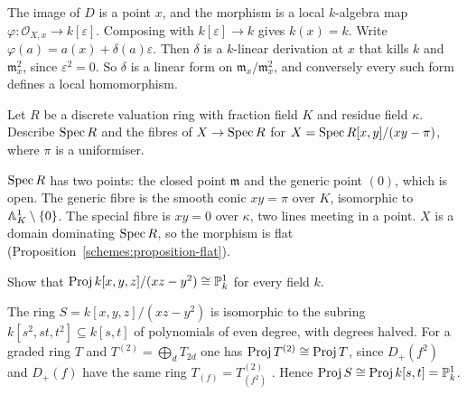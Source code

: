\begin{solution}
The image of $D$ is a point $x$, and the morphism is a local $k$-algebra map $\varphi \colon \mathcal{O}_{X,x} \to k[\varepsilon]$. Composing with
$k[\varepsilon] \to k$ gives $k(x) = k$. Write $\varphi(a) = a(x) + \delta(a)\varepsilon$. Then $\delta$ is a $k$-linear derivation at $x$ that kills $k$ and $\mathfrak{m}_x^2$,
since $\varepsilon^2 = 0$. So $\delta$ is a linear form on $\mathfrak{m}_x/\mathfrak{m}_x^2$, and conversely every such form defines a local homomorphism.
\end{solution}

\begin{exercise}\label{schemes:exercise-dvr}
Let $R$ be a discrete valuation ring with fraction field $K$ and residue field $\kappa$. Describe $\operatorname{Spec} R$ and the fibres of $X \to \operatorname{Spec} R$ for
$X = \operatorname{Spec} R[x, y]/(xy - \pi)$, where $\pi$ is a uniformiser.
\end{exercise}

\begin{solution}
$\operatorname{Spec} R$ has two points: the closed point $\mathfrak{m}$ and the generic point $(0)$, which is open. The generic fibre is the smooth conic $xy = \pi$ over
$K$, isomorphic to $\mathbb{A}^1_K \setminus \{0\}$. The special fibre is $xy = 0$ over $\kappa$, two lines meeting in a point. $X$ is a domain dominating $\operatorname{Spec} R$,
so the morphism is flat (Proposition~\ref{schemes:proposition-flat}).
\end{solution}

\begin{exercise}\label{schemes:exercise-proj-conic}
Show that $\operatorname{Proj} k[x, y, z]/(xz - y^2) \cong \mathbb{P}^1_k$ for every field $k$.
\end{exercise}

\begin{solution}
The ring $S = k[x, y, z]/(xz - y^2)$ is isomorphic to the subring $k[s^2, st, t^2] \subseteq k[s, t]$ of polynomials of even degree, with degrees halved.
For a graded ring $T$ and $T^{(2)} = \bigoplus_dT_{2d}$ one has $\operatorname{Proj} T^{(2)} \cong \operatorname{Proj} T$, since $D_+(f^2)$ and $D_+(f)$ have the same ring
$T_{(f)} = T^{(2)}_{(f^2)}$ \cite[Exercise II.5.13]{hartshorne-ag}. Hence $\operatorname{Proj} S \cong \operatorname{Proj} k[s, t] = \mathbb{P}^1_k$.
\end{solution}
